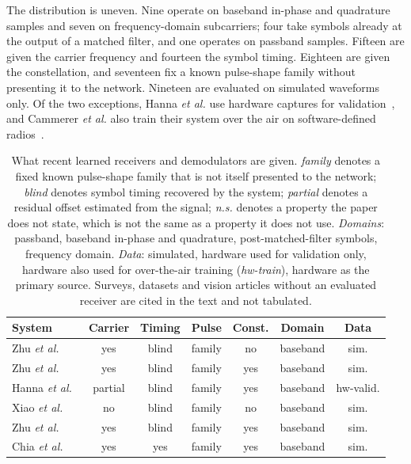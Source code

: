 \documentclass{ieeeaccess}
\begin{document}
The distribution is uneven. Nine operate on baseband in-phase and quadrature
samples and seven on frequency-domain subcarriers; four take symbols already at
the output of a matched filter, and one operates on passband samples.
Fifteen are given the carrier frequency and fourteen the symbol timing.
Eighteen are given the constellation, and seventeen fix a known pulse-shape
family without presenting it to the network. Nineteen are evaluated on
simulated waveforms only. Of the two exceptions, Hanna \textit{et al.} use
hardware captures for validation~\cite{Hanna2022SignalProcessing}, and
Cammerer \textit{et al.} also train their system over the air on software-defined
radios~\cite{cammerer2020trainableCS}.

\begin{table}[!t]
\caption{What recent learned receivers and demodulators are given.
\emph{family} denotes a fixed known pulse-shape family that is not itself
presented to the network; \emph{blind} denotes symbol timing recovered by the
system; \emph{partial} denotes a residual offset estimated from the signal;
\emph{n.s.} denotes a property the paper does not state, which is not the same
as a property it does not use. \emph{Domains}: passband, baseband in-phase and
quadrature, post-matched-filter symbols, frequency domain. \emph{Data}: simulated,
hardware used for validation only, hardware also used for over-the-air training
(\emph{hw-train}), hardware as the primary source. Surveys, datasets and vision
articles without an evaluated receiver are cited in the text and not tabulated.}
\label{tab:related_a}
\centering
\begin{tabular}{lcccccc}
\toprule
System & Carrier & Timing & Pulse & Const. & Domain & Data \\
\midrule
Zhu \textit{et al.}~\cite{Zhu2022WaveformLevelIntelligence} & yes & blind & family & no & baseband & sim. \\
Zhu \textit{et al.}~\cite{Zhu2022EndtoEnd} & yes & blind & family & yes & baseband & sim. \\
Hanna \textit{et al.}~\cite{Hanna2022SignalProcessing} & partial & blind & family & yes & baseband & hw-valid. \\
Xiao \textit{et al.}~\cite{Xiao2023_UnifiedDeep} & no & blind & family & no & baseband & sim. \\
Zhu \textit{et al.}~\cite{Zhu2023DLWave} & yes & blind & family & yes & baseband & sim. \\
Chia \textit{et al.}~\cite{Chia2022RN} & yes & yes & family & yes & baseband & sim. \\

\end{tabular}
\end{table}
\end{document}
